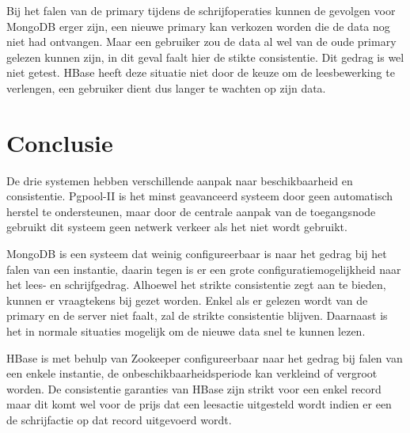 Bij het falen van de primary tijdens de schrijfoperaties kunnen de gevolgen voor MongoDB erger zijn, een nieuwe primary kan verkozen worden die de data nog niet had ontvangen. Maar een gebruiker zou de data al wel van de oude primary gelezen kunnen zijn, in dit geval faalt hier de stikte consistentie. Dit gedrag is wel niet getest. HBase heeft deze situatie niet door de keuze om de leesbewerking te verlengen, een gebruiker dient dus langer te wachten op zijn data. 

\section{Conclusie}
De drie systemen hebben verschillende aanpak naar beschikbaarheid en consistentie. Pgpool-II is het minst geavanceerd systeem door geen automatisch herstel te ondersteunen, maar door de centrale aanpak van de toegangsnode gebruikt dit systeem geen netwerk verkeer als het niet wordt gebruikt. 

MongoDB is een systeem dat weinig configureerbaar is naar het gedrag bij het falen van een instantie, daarin tegen is er een grote configuratiemogelijkheid naar het lees- en schrijfgedrag. Alhoewel het strikte consistentie zegt aan te bieden, kunnen er vraagtekens bij gezet worden. Enkel als er gelezen wordt van de primary en de server niet faalt, zal de strikte consistentie blijven. Daarnaast is het in normale situaties mogelijk om de nieuwe data snel te kunnen lezen. 

HBase is met behulp van Zookeeper configureerbaar naar het gedrag bij falen van een enkele instantie, de onbeschikbaarheidsperiode kan verkleind of vergroot worden. De consistentie garanties van HBase zijn strikt voor een enkel record maar dit komt wel voor de prijs dat een leesactie uitgesteld wordt indien er een de schrijfactie op dat record uitgevoerd wordt. 